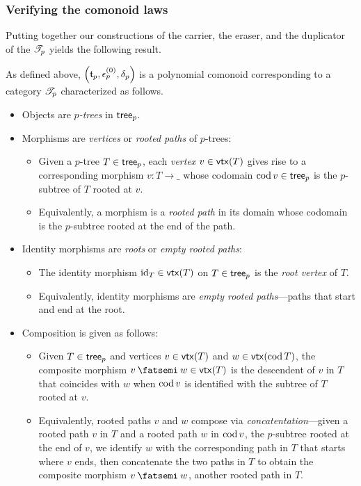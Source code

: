 \documentclass[Book-Poly]{subfiles}
\begin{document}
\subsubsection{Verifying the comonoid laws}

Putting together our constructions of the carrier, the eraser, and the duplicator of the $\mathscr{T}_{p}$ yields the following result.
\begin{proposition} \label{prop.cofree_as_cat}
As defined above, $\left(\mathfrak{t}_p,\epsilon^{(0)}_p,\delta_p\right)$ is a polynomial comonoid corresponding to a category $\mathscr{T}_{p}$ characterized as follows.
\begin{itemize}
    \item Objects are \textit{$p$-trees} in $\mathsf{tree}_p$.
    \item Morphisms are \textit{vertices} or \textit{rooted paths} of $p$-trees:%
    \begin{itemize}
        \item Given a $p$-tree $T\in\mathsf{tree}_p$, each \textit{vertex} $v\in\mathsf{vtx}(T)$ gives rise to a corresponding morphism $v\colon T\to\_$ whose codomain $\operatorname{cod} v\in\mathsf{tree}_p$ is the $p$-subtree of $T$ rooted at $v$.
        \item Equivalently, a morphism is a \textit{rooted path} in its domain whose codomain is the $p$-subtree rooted at the end of the path.
    \end{itemize}
    \item Identity morphisms are \textit{roots} or \textit{empty rooted paths}:
    \begin{itemize}
        \item The identity morphism $\mathrm{id}_T\in\mathsf{vtx}(T)$ on $T\in\mathsf{tree}_p$ is the \textit{root vertex} of $T$.
        \item Equivalently, identity morphisms are \textit{empty rooted paths}---paths that start and end at the root.
    \end{itemize}
    \item Composition is given as follows:
    \begin{itemize}
        \item Given $T\in\mathsf{tree}_p$ and vertices $v\in\mathsf{vtx}(T)$ and $w\in\mathsf{vtx}(\operatorname{cod} T)$, the composite morphism $v\then w\in\vtx(T)$ is the descendent of $v$ in $T$ that coincides with $w$ when $\operatorname{cod} v$ is identified with the subtree of $T$ rooted at $v$.
        \item Equivalently, rooted paths $v$ and $w$ compose via \textit{concatentation}---given a rooted path $v$ in $T$ and a rooted path $w$ in $\operatorname{cod} v$, the $p$-subtree rooted at the end of $v$, we identify $w$ with the corresponding path in $T$ that starts where $v$ ends, then concatenate the two paths in $T$ to obtain the composite morphism $v\then w$, another rooted path in $T$.
    \end{itemize}
\end{itemize}
\end{proposition}
\end{document}
